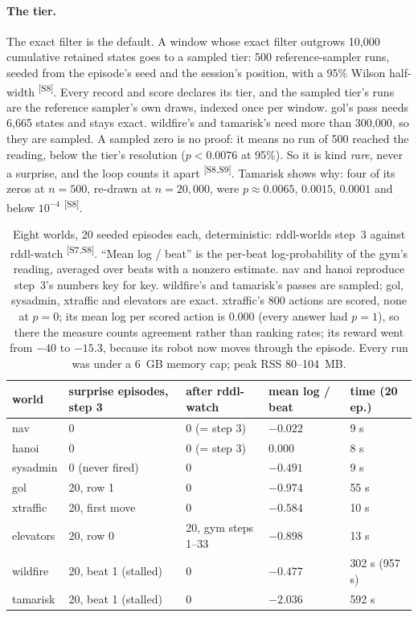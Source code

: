 \documentclass[11pt]{article}
\newcommand{\src}[1]{\textsuperscript{[#1]}}
\begin{document}
\paragraph{The tier.} The exact filter is the default. A window whose
exact filter outgrows 10{,}000 cumulative retained states goes to a
sampled tier: 500 reference-sampler runs, seeded from the episode's seed
and the session's position, with a 95\% Wilson half-width \src{S8}.
Every record and score declares its tier, and the sampled tier's runs are
the reference sampler's own draws, indexed once per window. gol's pass
needs 6{,}665 states and stays exact. wildfire's and tamarisk's need more
than 300{,}000, so they are sampled. A sampled zero is no proof: it means
no run of 500 reached the reading, below the tier's resolution ($p <
0.0076$ at 95\%). So it is kind \emph{rare}, never a surprise, and the
loop counts it apart \src{S8,S9}. Tamarisk shows why: four of its zeros
at $n=500$, re-drawn at $n=20{,}000$, were $p \approx 0.0065$, $0.0015$,
$0.0001$ and below $10^{-4}$ \src{S8}.

\begin{table}[t]
\small\centering
\begin{tabular}{@{}lllll@{}}
\toprule
world & surprise episodes, step 3 & after rddl-watch & mean log / beat & time (20 ep.) \\
\midrule
nav & 0 & 0 (= step 3) & $-0.022$ & 9 s \\
hanoi & 0 & 0 (= step 3) & $0.000$ & 8 s \\
sysadmin & 0 (never fired) & 0 & $-0.491$ & 9 s \\
gol & 20, row 1 & 0 & $-0.974$ & 55 s \\
xtraffic & 20, first move & 0 & $-0.584$ & 10 s \\
elevators & 20, row 0 & 20, gym steps 1--33 & $-0.898$ & 13 s \\
wildfire & 20, beat 1 (stalled) & 0 & $-0.477$ & 302 s (957 s) \\
tamarisk & 20, beat 1 (stalled) & 0 & $-2.036$ & 592 s \\
\bottomrule
\end{tabular}
\caption{Eight worlds, 20 seeded episodes each, deterministic: rddl-worlds
step~3 against rddl-watch \src{S7,S8}. ``Mean log / beat'' is
the per-beat log-probability of the gym's reading, averaged over beats
with a nonzero estimate. nav and hanoi reproduce step~3's numbers key for
key. wildfire's and tamarisk's passes are sampled; gol, sysadmin, xtraffic
and elevators are exact. xtraffic's 800 actions are scored, none at
$p=0$; its mean log per scored action is $0.000$ (every answer had $p=1$),
so there the measure counts agreement rather than ranking rates; its reward went from $-40$ to $-15.3$, because its robot now moves
through the episode. Every run was under a 6~GB memory cap; peak RSS
80--104~MB.}
\label{tab:rddl}
\end{table}
\end{document}
